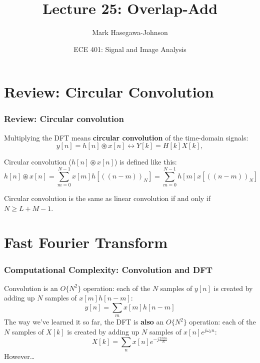 \documentclass{beamer}
\title{Lecture 25: Overlap-Add}
\author{Mark Hasegawa-Johnson}
\date{ECE 401: Signal and Image Analysis}
\begin{document}
\begin{frame}
  \maketitle
\end{frame}

\begin{frame}
  \tableofcontents
\end{frame}

\section[Review]{Review: Circular Convolution}
\setcounter{subsection}{1}

\begin{frame}
  \frametitle{Review: Circular convolution}

  Multiplying the DFT means {\bf circular convolution} of the time-domain signals:
  \begin{displaymath}
    y[n]=h[n]\circledast x[n] \leftrightarrow Y[k] = H[k]X[k],
  \end{displaymath}
  
  Circular convolution ($h[n]\circledast x[n]$) is defined like this:
  \begin{displaymath}
    h[n]\circledast x[n] = \sum_{m=0}^{N-1}x[m]h\left[(\!(n-m)\!)_N\right]
    = \sum_{m=0}^{N-1}h[m]x\left[(\!(n-m)\!)_N\right]
  \end{displaymath}

  Circular convolution is the same as linear convolution if and only if $N\ge L+M-1$.
\end{frame}

\section[FFT]{Fast Fourier Transform}
\setcounter{subsection}{1}

\begin{frame}
  \frametitle{Computational Complexity: Convolution and DFT}

  Convolution is an $O\{N^2\}$ operation: each of the $N$ samples of
  $y[n]$ is created by adding up $N$ samples of $x[m]h[n-m]$:
  \begin{displaymath}
    y[n] = \sum_m x[m] h[n-m]
  \end{displaymath}
  The way we've learned it so far, the DFT is {\bf also} an $O\{N^2\}$
  operation: each of the $N$ samples of $X[k]$ is created by adding up
  $N$ samples of $x[n]e^{j\omega_k n}$:
  \begin{displaymath}
    X[k] = \sum_n x[n] e^{-j\frac{2\pi kn}{N}}
  \end{displaymath}
  However\ldots
\end{frame}
\end{document}
